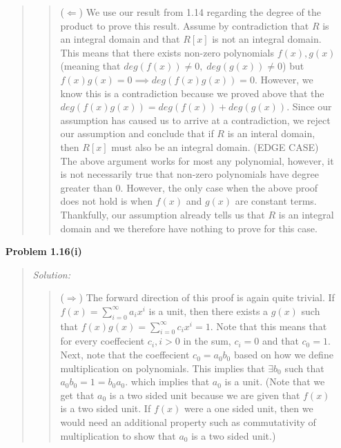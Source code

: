 \documentclass{article}
\newcommand{\Solution}{\textit{Solution: }}
\begin{document}
\begin{enumerate}
\begin{quote}
                \begin{quote}
                    ($\Leftarrow$) We use our result from 1.14 regarding the degree of the product to prove this result. Assume by contradiction
                    that $R$ is an integral domain and that $R[x]$ is not an integral domain. This means that there exists non-zero polynomials $f(x), g(x)$
                    (meaning that $deg(f(x)) \neq 0, \; deg(g(x)) \neq 0$) but $f(x)g(x) = 0 \implies deg(f(x)g(x)) = 0$. However, we know this is a 
                    contradiction because we proved above that the $deg(f(x)g(x)) = deg(f(x)) + deg(g(x))$. Since our assumption has caused us to arrive
                    at a contradiction, we reject our assumption and conclude that if $R$ is an interal domain, then $R[x]$ must also be an integral
                    domain. (EDGE CASE) The above argument works for most any polynomial, however, it is not necessarily true that non-zero polynomials
                    have degree greater than 0. However, the only case when the above proof does not hold is when $f(x)$ and $g(x)$ are constant terms.
                    Thankfully, our assumption already tells us that $R$ is an integral domain and we therefore have nothing to prove for this case. \qedsymbol
                \end{quote}
            \end{quote} 
        \item[\textbf{Problem 1.16(i)}]
            \begin{quote}
                \Solution
                \begin{quote}
                    ($\Rightarrow$) The forward direction of this proof is again quite trivial. If $f(x) = \sum_{i = 0}^\infty a_ix^i$
                    is a unit, then there exists a $g(x)$ such that $f(x)g(x) = \sum_{i = 0}^\infty c_ix^i = 1$. Note that this means that 
                    for every coeffecient $c_i, i > 0$ in the sum, $c_i = 0$ and that $c_0 = 1$. Next, note that the coeffecient $c_0 = a_0b_0$
                    based on how we define multiplication on polynomials. This implies that $\exists b_0$ such that $a_0b_0 = 1 = b_0a_0$. which
                    implies that $a_0$ is a unit. (Note that we get that $a_0$ is a two sided unit because we are given that $f(x)$ is a two sided
                    unit. If $f(x)$ were a one sided unit, then we would need an additional property such as commutativity of multiplication to show
                    that $a_0$ is a two sided unit.)
                \end{quote}


\end{quote}
\end{enumerate}
\end{document}

